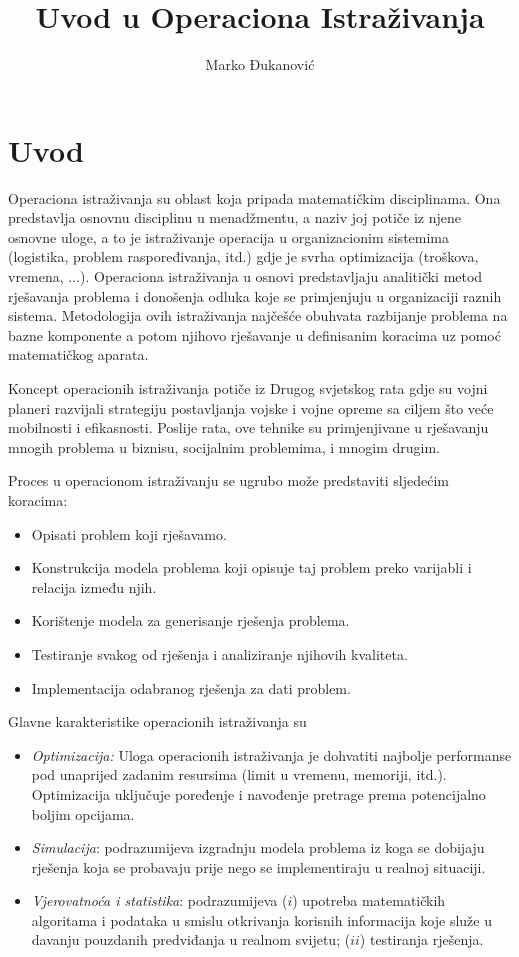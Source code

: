\documentclass[a4paper, utf8, 11pt, colorlinks]{book}
\author{
 Marko Đukanović  
}
\title{Uvod u Operaciona Istraživanja}
\begin{document}
\maketitle
\newpage
\tableofcontents

\newpage

\chapter{Uvod}

Operaciona istraživanja su oblast koja pripada matematičkim disciplinama. Ona predstavlja osnovnu disciplinu u menadžmentu, a naziv joj potiče iz njene osnovne uloge, a to je istraživanje  operacija u organizacionim sistemima (logistika, problem raspoređivanja, itd.) gdje je svrha optimizacija (troškova, vremena, $\ldots$). Operaciona istraživanja u osnovi predstavljaju analitički metod rješavanja problema i donošenja odluka koje se primjenjuju u organizaciji raznih sistema. Metodologija ovih istraživanja  najčešće obuhvata razbijanje problema na bazne komponente a potom njihovo rješavanje u definisanim koracima uz pomoć matematičkog aparata. 

Koncept operacionih istraživanja potiče iz Drugog svjetskog rata gdje su vojni planeri razvijali strategiju postavljanja vojske i vojne opreme sa ciljem što veće mobilnosti i efikasnosti. Poslije rata, ove tehnike su primjenjivane u rješavanju mnogih problema u biznisu, socijalnim problemima, i mnogim drugim. 

Proces u operacionom istraživanju se ugrubo može predstaviti sljedećim koracima:
\begin{itemize}
    \item Opisati problem koji rješavamo.
    \item Konstrukcija modela problema koji opisuje taj problem preko varijabli i relacija između njih. 
    \item Korištenje modela za generisanje rješenja problema.
    \item Testiranje svakog od rješenja i analiziranje njihovih  kvaliteta.
    \item Implementacija odabranog rješenja za dati problem. 
\end{itemize}
Glavne karakteristike operacionih istraživanja su
\begin{itemize}
    \item \emph{Optimizacija:} Uloga operacionih istraživanja je dohvatiti najbolje performanse pod unaprijed zadanim resursima (limit u vremenu, memoriji, itd.).  Optimizacija uključuje poređenje i navođenje pretrage prema 
    potencijalno boljim opcijama.
    \item \emph{Simulacija}:  podrazumijeva izgradnju modela problema iz koga se dobijaju rješenja koja se probavaju prije nego se implementiraju u realnoj situaciji.
    \item \emph{Vjerovatnoća i statistika}:  podrazumijeva ($i$) upotreba matematičkih algoritama i podataka u smislu otkrivanja korisnih informacija koje služe u davanju pouzdanih predviđanja u realnom svijetu; ($ii$) testiranja rješenja.
\end{itemize}
 
\end{document}
